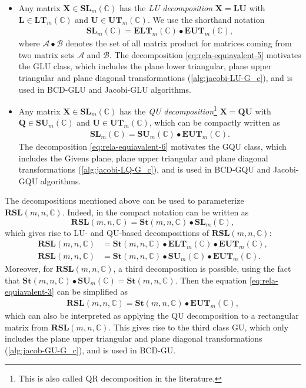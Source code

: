 \documentclass[final,onefignum,onetabnum]{siamart190516}
\newcommand{\matr}[1]{\boldsymbol{#1}}
\newcommand{\CC}{\mathbb{C}}
\newcommand{\SUNN}[1]{\mathbf{SU}_{#1}}
\newcommand{\SL}{\mathbf{SL}}
\newcommand{\St}{\mathbf{St}}
\newcommand{\UT}{\mathbf{UT}}
\newcommand{\EUT}{\mathbf{EUT}}
\newcommand{\LT}{\mathbf{LT}}
\newcommand{\ELT}{\mathbf{ELT}}
\begin{document}
\begin{itemize}
\item Any matrix $\matr{X}\in\SL_{m}(\CC)$ has the \emph{LU decomposition} \cite{GoluV96:jhu} $\matr{X}=\matr{L}\matr{U}$ with $\matr{L}\in\LT_{m}(\CC)$ and $\matr{U}\in\UT_{m}(\CC)$. 
We use the shorthand notation 
\begin{align}
\SL_m(\CC) =
\ELT_{m}(\CC)\bullet\EUT_{m}(\CC),
\label{eq:rela-equiavalent-5}
\end{align}
where $\mathcal{A} \bullet \mathcal{B}$ denotes the set of all matrix product for matrices coming from two matrix sets $\mathcal{A}$ and $\mathcal{B}$.
The decomposition \cref{eq:rela-equiavalent-5} motivates the GLU class, which includes the plane lower triangular, plane upper triangular and plane diagonal transformations (\autoref{alg:jacobi-LU-G_c}), and is used in BCD-GLU and Jacobi-GLU algorithms.  

\item Any matrix $\matr{X}\in\SL_{m}(\CC)$ has the \emph{QU decomposition}\footnote{This is also called QR decomposition in the literature.} $\matr{X}=\matr{Q}\matr{U}$ with $\matr{Q}\in\SUNN{m}(\CC)$ and $\matr{U}\in\UT_{m}(\CC)$, which can be compactly written as 
\begin{align}
\SL_m(\CC) =
\SUNN{m}(\CC)\bullet\EUT_{m}(\CC).
\label{eq:rela-equiavalent-6}
\end{align}
The decomposition \cref{eq:rela-equiavalent-6} motivates the GQU class, which includes the Givens plane, plane upper triangular and plane diagonal transformations (\autoref{alg:jacobi-LQ-G_c}), and is used in BCD-GQU and Jacobi-GQU algorithms. 
\end{itemize}

The decompositions mentioned above  can be used to parameterize $\textbf{RSL}(m,n,\CC)$.
Indeed,   in the compact notation can be written as
\[
\textbf{RSL}(m,n,\CC) =\St(m,n,\CC)\bullet\SL_m(\CC),
\]
which gives rise to  LU- and QU-based decompositions of $\textbf{RSL}(m,n,\CC)$:
\begin{align}
\textbf{RSL}(m,n,\CC) &=
\St(m,n,\CC)\bullet\ELT_{m}(\CC)\bullet\EUT_{m}(\CC),
\label{eq:rela-equiavalent-2} \\
\textbf{RSL}(m,n,\CC) &=
\St(m,n,\CC)\bullet\SUNN{m}(\CC)\bullet\EUT_{m}(\CC).
\label{eq:rela-equiavalent-3}
\end{align}
Moreover, for  $\textbf{RSL}(m,n,\CC)$, a third decomposition is possible, using the fact that  $\St(m,n,\CC)\bullet\SUNN{m}(\CC) = \St(m,n,\CC)$.
Then the equation \cref{eq:rela-equiavalent-3} can be simplified as 
\begin{align}
\textbf{RSL}(m,n,\CC) =\St(m,n,\CC)\bullet\EUT_{m}(\CC),
\label{eq:rela-equiavalent-13}
\end{align}
which can also be interpreted as applying the  QU decomposition  to a rectangular matrix from  $\textbf{RSL}(m,n,\CC)$. 
This gives rise to the third class GU, which only includes the plane upper triangular and plane diagonal transformations (\autoref{alg:jacob-GU-G_c}), and is used in BCD-GU. 
\end{document}
